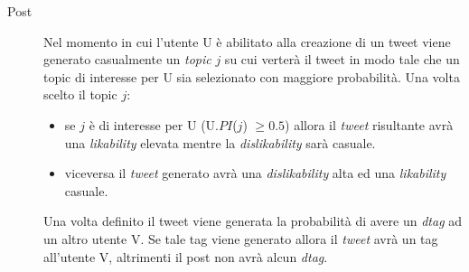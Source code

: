 \documentclass[a4paper,12pt]{article}
\begin{document}
\begin{description}

  \item[Post] Nel momento in cui l'utente U \`e abilitato alla 
  creazione di un tweet viene generato casualmente un 
  \textit{topic} $j$ su cui verter\`a il tweet in modo tale che un topic 
  di interesse per U sia selezionato con maggiore probabilit\`a.
  Una volta scelto il topic $j$:
  \begin{itemize}
    \item se $j$ \`e di interesse per U (U.$PI$($j$) $\geq 0.5$)
     allora il \textit{tweet} risultante
    avr\`a una \textit{likability} elevata mentre la \textit{dislikability} sar\`a casuale.
    \item viceversa il \textit{tweet} generato avr\`a una \textit{dislikability} alta ed
    una \textit{likability} casuale.
  \end{itemize}
  Una volta definito il tweet viene generata la probabilit\`a di 
  avere un \textit{dtag} ad un altro utente V. Se tale tag viene generato allora il \textit{tweet} avr\`a
  un tag all'utente V, altrimenti il post non avr\`a alcun \textit{dtag}.
  

\end{description}
\end{document}
